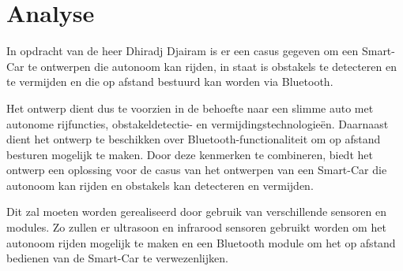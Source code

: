 \section{Analyse}
In opdracht van de heer Dhiradj Djairam is er een casus gegeven om een \gls{Smart-Car} te ontwerpen die \gls{autonoom} kan rijden, in staat is obstakels te detecteren en te vermijden en die op afstand bestuurd kan worden via \gls{Bluetooth}. 

Het ontwerp dient dus te voorzien in de behoefte naar een slimme auto met autonome rijfuncties, obstakeldetectie- en vermijdingstechnologieën. Daarnaast dient het ontwerp te beschikken over \gls{Bluetooth}-functionaliteit om op afstand besturen mogelijk te maken. Door deze kenmerken te combineren, biedt het ontwerp een oplossing voor de casus van het ontwerpen van een \gls{Smart-Car} die \gls{autonoom} kan rijden en obstakels kan detecteren en vermijden.

Dit zal moeten worden gerealiseerd door gebruik van verschillende sensoren en modules. Zo zullen er ultrasoon en infrarood sensoren gebruikt worden om het autonoom rijden mogelijk te maken en een \gls{Bluetooth} module om het op afstand bedienen van de \gls{Smart-Car} te verwezenlijken. 


 
